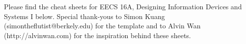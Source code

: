 \documentclass[10pt, article, oneside]{memoir}
\begin{document}
	\maketitle
	
	Please find the cheat sheets for EECS 16A, Designing Information Devices and Systems I below. Special thank-yous to Simon Kuang (simontheflutist@berkely.edu) for the template and to Alvin Wan (http://alvinwan.com) for the inspiration behind these sheets.
	
	\newpage
	\tableofcontents*
	
	
	
	\newpage
	
\end{document}
